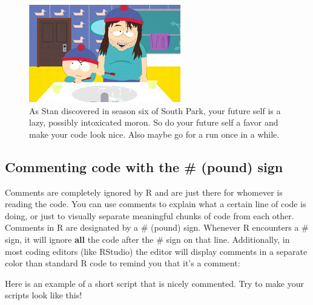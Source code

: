 \documentclass[
]{book}
\begin{document}
\begin{figure}

{\centering \includegraphics[width=0.5\linewidth]{images/chapter-2/futureself} 

}

\caption{As Stan discovered in season six of South Park, your future self is a lazy, possibly intoxicated moron. So do your future self a favor and make your code look nice. Also maybe go for a run once in a while.}\label{fig:futureself}
\end{figure}

\hypertarget{commenting-code-with-the-pound-sign}{%
\subsection{Commenting code with the \# (pound) sign}\label{commenting-code-with-the-pound-sign}}

Comments are completely ignored by R and are just there for whomever is reading the code. You can use comments to explain what a certain line of code is doing, or just to visually separate meaningful chunks of code from each other. Comments in R are designated by a \# (pound) sign. Whenever R encounters a \# sign, it will ignore \textbf{all} the code after the \# sign on that line. Additionally, in most coding editors (like RStudio) the editor will display comments in a separate color than standard R code to remind you that it's a comment:

Here is an example of a short script that is nicely commented. Try to make your scripts look like this!
\end{document}
